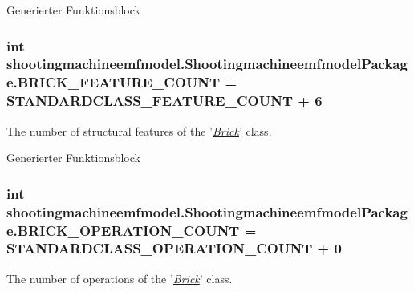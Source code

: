 Generierter Funktionsblock  \hypertarget{interfaceshootingmachineemfmodel_1_1_shootingmachineemfmodel_package_aa6135c0087ddefa4bda2cd529937b4bf}{
\subsubsection[{B\-R\-I\-C\-K\-\_\-\-F\-E\-A\-T\-U\-R\-E\-\_\-\-C\-O\-U\-N\-T}]{\setlength{\rightskip}{0pt plus 5cm}int shootingmachineemfmodel.\-Shootingmachineemfmodel\-Package.\-B\-R\-I\-C\-K\-\_\-\-F\-E\-A\-T\-U\-R\-E\-\_\-\-C\-O\-U\-N\-T = {\bf S\-T\-A\-N\-D\-A\-R\-D\-C\-L\-A\-S\-S\-\_\-\-F\-E\-A\-T\-U\-R\-E\-\_\-\-C\-O\-U\-N\-T} + 6}}\label{interfaceshootingmachineemfmodel_1_1_shootingmachineemfmodel_package_aa6135c0087ddefa4bda2cd529937b4bf}
The number of structural features of the '{\itshape \hyperlink{interfaceshootingmachineemfmodel_1_1_brick}{Brick}}' class.

Generierter Funktionsblock  \hypertarget{interfaceshootingmachineemfmodel_1_1_shootingmachineemfmodel_package_a1c0b9ea1c59e43a9df5e05458d39e1fa}{
\subsubsection[{B\-R\-I\-C\-K\-\_\-\-O\-P\-E\-R\-A\-T\-I\-O\-N\-\_\-\-C\-O\-U\-N\-T}]{\setlength{\rightskip}{0pt plus 5cm}int shootingmachineemfmodel.\-Shootingmachineemfmodel\-Package.\-B\-R\-I\-C\-K\-\_\-\-O\-P\-E\-R\-A\-T\-I\-O\-N\-\_\-\-C\-O\-U\-N\-T = {\bf S\-T\-A\-N\-D\-A\-R\-D\-C\-L\-A\-S\-S\-\_\-\-O\-P\-E\-R\-A\-T\-I\-O\-N\-\_\-\-C\-O\-U\-N\-T} + 0}}\label{interfaceshootingmachineemfmodel_1_1_shootingmachineemfmodel_package_a1c0b9ea1c59e43a9df5e05458d39e1fa}
The number of operations of the '{\itshape \hyperlink{interfaceshootingmachineemfmodel_1_1_brick}{Brick}}' class.

